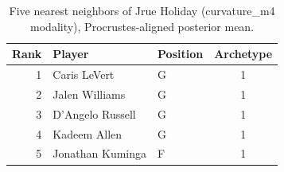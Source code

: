 \begin{table}[htbp]
  \centering\small
  \begin{tabular}{rllc}
    \toprule
    Rank & Player & Position & Archetype \\
    \midrule
    1 & Caris LeVert & G & 1 \\
    2 & Jalen Williams & G & 1 \\
    3 & D'Angelo Russell & G & 1 \\
    4 & Kadeem Allen & G & 1 \\
    5 & Jonathan Kuminga & F & 1 \\
    \bottomrule
  \end{tabular}
  \caption{Five nearest neighbors of Jrue Holiday (curvature_m4 modality), Procrustes-aligned posterior mean.}
  \label{tab:Jrue_Holiday_neighbors_curvature_m4}
\end{table}


